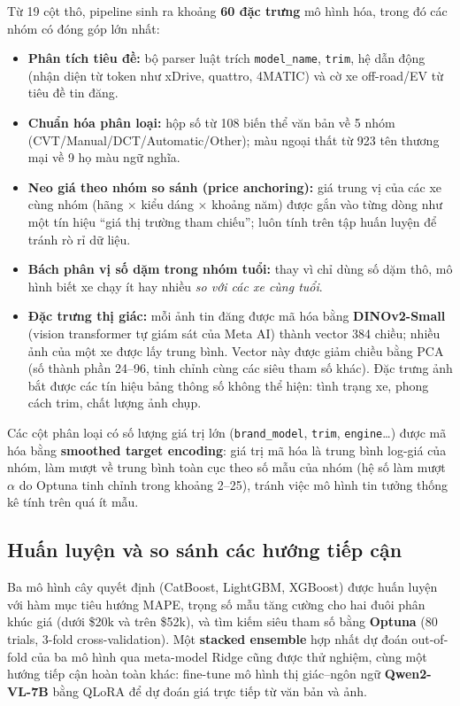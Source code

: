 Từ 19 cột thô, pipeline sinh ra khoảng \textbf{60 đặc trưng} mô hình hóa, trong đó các nhóm có đóng góp lớn nhất:

\begin{itemize}
    \item \textbf{Phân tích tiêu đề:} bộ parser luật trích \texttt{model\_name}, \texttt{trim}, hệ dẫn động (nhận diện từ token như xDrive, quattro, 4MATIC) và cờ xe off-road/EV từ tiêu đề tin đăng.
    \item \textbf{Chuẩn hóa phân loại:} hộp số từ 108 biến thể văn bản về 5 nhóm (CVT/Manual/DCT/Automatic/Other); màu ngoại thất từ 923 tên thương mại về 9 họ màu ngữ nghĩa.
    \item \textbf{Neo giá theo nhóm so sánh (price anchoring):} giá trung vị của các xe cùng nhóm (hãng $\times$ kiểu dáng $\times$ khoảng năm) được gắn vào từng dòng như một tín hiệu ``giá thị trường tham chiếu''; luôn tính trên tập huấn luyện để tránh rò rỉ dữ liệu.
    \item \textbf{Bách phân vị số dặm trong nhóm tuổi:} thay vì chỉ dùng số dặm thô, mô hình biết xe chạy ít hay nhiều \textit{so với các xe cùng tuổi}.
    \item \textbf{Đặc trưng thị giác:} mỗi ảnh tin đăng được mã hóa bằng \textbf{DINOv2-Small} (vision transformer tự giám sát của Meta AI) thành vector 384 chiều; nhiều ảnh của một xe được lấy trung bình. Vector này được giảm chiều bằng PCA (số thành phần 24--96, tinh chỉnh cùng các siêu tham số khác). Đặc trưng ảnh bắt được các tín hiệu bảng thông số không thể hiện: tình trạng xe, phong cách trim, chất lượng ảnh chụp.
\end{itemize}

Các cột phân loại có số lượng giá trị lớn (\texttt{brand\_model}, \texttt{trim}, \texttt{engine}\ldots) được mã hóa bằng \textbf{smoothed target encoding}: giá trị mã hóa là trung bình log-giá của nhóm, làm mượt về trung bình toàn cục theo số mẫu của nhóm (hệ số làm mượt $\alpha$ do Optuna tinh chỉnh trong khoảng 2--25), tránh việc mô hình tin tưởng thống kê tính trên quá ít mẫu.

\subsection{Huấn luyện và so sánh các hướng tiếp cận}

Ba mô hình cây quyết định (CatBoost, LightGBM, XGBoost) được huấn luyện với hàm mục tiêu hướng MAPE, trọng số mẫu tăng cường cho hai đuôi phân khúc giá (dưới \$20k và trên \$52k), và tìm kiếm siêu tham số bằng \textbf{Optuna} (80 trials, 3-fold cross-validation). Một \textbf{stacked ensemble} hợp nhất dự đoán out-of-fold của ba mô hình qua meta-model Ridge cũng được thử nghiệm, cùng một hướng tiếp cận hoàn toàn khác: fine-tune mô hình thị giác--ngôn ngữ \textbf{Qwen2-VL-7B} bằng QLoRA để dự đoán giá trực tiếp từ văn bản và ảnh.

